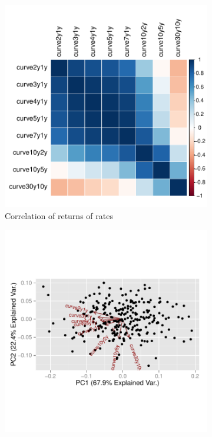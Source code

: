 \documentclass[11pt]{scrreprt}
\begin{document}
\begin{figure}[H]
\begin{subfigure}{.3\textwidth}
\centering\includegraphics[]{corrplot-curve-returns.pdf}
\caption{Correlation of returns of rates}
\end{subfigure}
\begin{subfigure}{.3\textwidth}
\centering\includegraphics[]{biplot-curve-returns.pdf}

\end{subfigure}
\end{figure}
\end{document}
